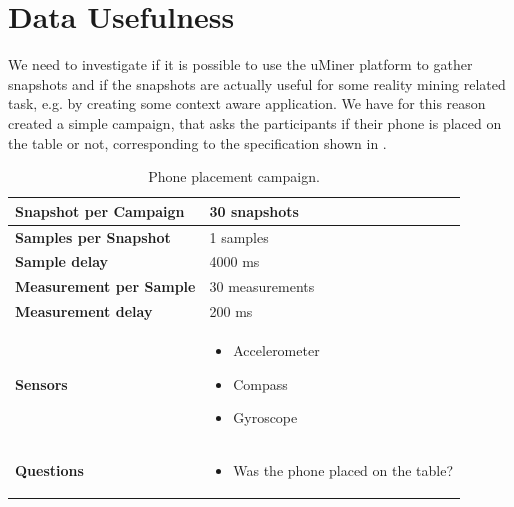 
\section{Data Usefulness}
\label{sec:data_usefulness}

We need to investigate if it is possible to use the uMiner platform to gather snapshots and if the snapshots are actually useful for some reality mining related task, e.g. by creating some context aware application. We have for this reason created a simple campaign, that asks the participants if their phone is placed on the table or not, corresponding to the specification shown in .

\begin{table}[!htbp]
    \centering
    \begin{tabular}{|m{}|m{}|} 
  \hline
  \textbf{Snapshot per Campaign}    & 30 snapshots      \\ \hline
  \textbf{Samples per Snapshot}     & 1 samples         \\ \hline
  \textbf{Sample delay}             & 4000 ms           \\ \hline
  \textbf{Measurement per Sample}   & 30 measurements   \\ \hline
  \textbf{Measurement delay}        & 200 ms            \\ \hline
  \textbf{Sensors}                  & \begin{itemize}[noitemsep]
                \item Accelerometer 
                \item Compass
                \item Gyroscope
              \end{itemize}                             \\ \hline
    \textbf{Questions}                & \begin{itemize}[noitemsep]
                                            \item Was the phone placed on the table?
                                        \end{itemize} \\ \hline
    \end{tabular}
    \caption{Phone placement campaign.}
    \label{tab:phone_placement_campaing}
\end{table}

